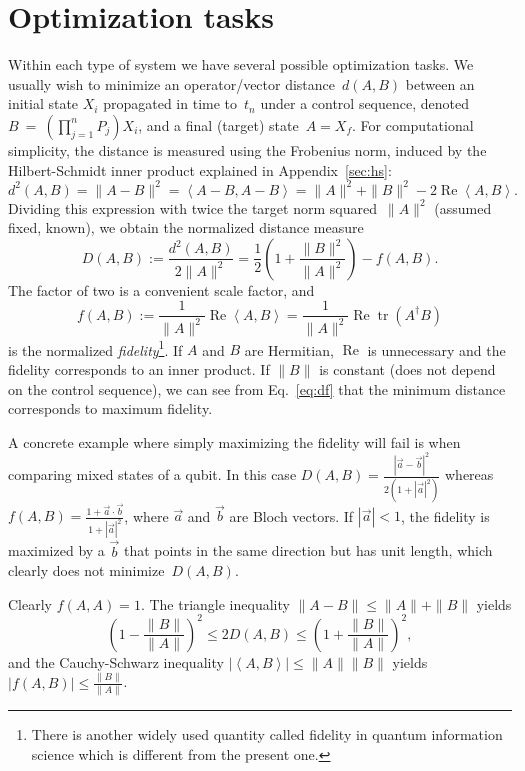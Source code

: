 \documentclass[aps, pra, a4paper, longbibliography, superscriptaddress]{revtex4-1}
\newcommand{\be}{\begin{equation}}
\newcommand{\ee}{\end{equation}}
\newcommand{\inprod}[2]{\left\langle #1, #2 \right\rangle}
\DeclareMathOperator{\tr}{tr}
\DeclareMathOperator{\re}{Re}
\begin{document}
\section{Optimization tasks}

Within each type of system we have several possible optimization tasks.
We usually wish to minimize an operator/vector distance~$d(A,B)$ between an
initial state $X_i$ propagated in time to~$t_n$ under a control sequence,
denoted~$B~=~\left(\prod_{j=1}^{n} P_j\right) X_i$,
and a final (target) state~$A = X_f$.
For computational simplicity, the distance is measured using the Frobenius
norm, induced by the Hilbert-Schmidt inner product explained in
Appendix~\ref{sec:hs}:
\be
d^2(A, B) = \|A-B\|^2
= \inprod{A-B}{A-B}
= \|A\|^2 +\|B\|^2 -2 \re \inprod{A}{B}.
\ee
Dividing this expression with twice the target norm squared~$\|A\|^2$ (assumed fixed,
known), we obtain the normalized distance measure
\be
\label{eq:df}
D(A,B)
:= \frac{d^2(A, B)}{2\|A\|^2}
= \frac{1}{2}\left(1 +\frac{\|B\|^2}{\|A\|^2}\right) -f(A, B).
\ee
The factor of two is a convenient scale factor, and
\be
f(A, B)
:= \frac{1}{\|A\|^2} \re \inprod{A}{B}
= \frac{1}{\|A\|^2} \re \tr(A^\dagger B)
\ee
is the normalized \emph{fidelity}\footnote{
There is another widely used quantity called fidelity in quantum information science which is different from the present one.}.
If $A$ and $B$ are Hermitian, $\re$ is unnecessary and the fidelity corresponds to an inner product.
If $\|B\|$ is constant (does not depend on the control sequence), we can see from Eq.~\eqref{eq:df} that
the minimum distance corresponds to maximum fidelity.

A concrete example where simply maximizing the fidelity will fail is when comparing mixed states of a qubit.
In this case $D(A,B) = \frac{|\vec{a}-\vec{b}|^2}{2(1+|\vec{a}|^2)}$
whereas $f(A,B) = \frac{1+\vec{a}\cdot\vec{b}}{1+|\vec{a}|^2}$, where
$\vec{a}$ and $\vec{b}$ are Bloch vectors. If $|\vec{a}| < 1$, the
fidelity is maximized by a $\vec{b}$ that points in the same direction
but has unit length, which clearly does not minimize~$D(A,B)$.


Clearly $f(A, A) = 1$.
The triangle inequality $\|A-B\| \le \|A\|+\|B\|$ yields
\be
\left(1 -\frac{\|B\|}{\|A\|} \right)^2 \le 2D(A, B) \le \left(1 +\frac{\|B\|}{\|A\|} \right)^2,
\ee
and the Cauchy-Schwarz inequality $|\inprod{A}{B}| \le \|A\|\|B\|$
yields
$|f(A, B)|
\le \frac{\|B\|}{\|A\|}$.
\end{document}
